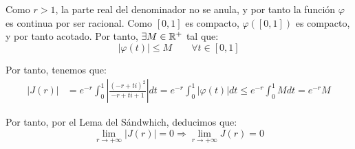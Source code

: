 \begin{ejercicio}
    Como $r>1$, la parte real del denominador no se anula, y por tanto la función $\varphi$ es continua por ser racional. Como $[0,1]$ es compacto, $\varphi\left(\left[0,1\right]\right)$ es compacto, y por tanto acotado. Por tanto, $\exists M\in \mathbb{R}^+$ tal que:
    \begin{equation*}
        \left|\varphi(t)\right| \leq M\qquad \forall t \in [0,1]
    \end{equation*}

    Por tanto, tenemos que:
    \begin{align*}
        |J(r)| &= e^{-r}\int_{0}^{1} \left|\frac{(-r+ti)^2}{-r+ti+1}\right|dt
        = e^{-r}\int_{0}^{1} \left|\varphi(t)\right|dt
        \leq e^{-r}\int_{0}^{1} M dt
        = e^{-r}M
    \end{align*}

    Por tanto, por el Lema del Sándwhich, deducimos que:
    \begin{equation*}
        \lim_{r\to+\infty} |J(r)| = 0
        \Longrightarrow \lim_{r\to+\infty} J(r) = 0
    \end{equation*}
\end{ejercicio}

